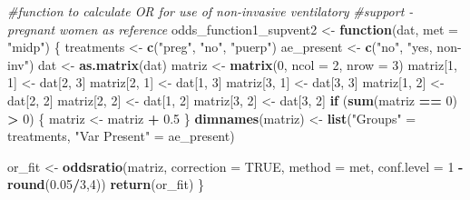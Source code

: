 \documentclass[
]{article}
\newenvironment{Shaded}{\begin{snugshade}}{\end{snugshade}}
\newcommand{\CommentTok}[1]{\textcolor[rgb]{0.56,0.35,0.01}{\textit{#1}}}
\newcommand{\ControlFlowTok}[1]{\textcolor[rgb]{0.13,0.29,0.53}{\textbf{#1}}}
\newcommand{\DataTypeTok}[1]{\textcolor[rgb]{0.13,0.29,0.53}{#1}}
\newcommand{\DecValTok}[1]{\textcolor[rgb]{0.00,0.00,0.81}{#1}}
\newcommand{\FloatTok}[1]{\textcolor[rgb]{0.00,0.00,0.81}{#1}}
\newcommand{\KeywordTok}[1]{\textcolor[rgb]{0.13,0.29,0.53}{\textbf{#1}}}
\newcommand{\NormalTok}[1]{#1}
\newcommand{\OperatorTok}[1]{\textcolor[rgb]{0.81,0.36,0.00}{\textbf{#1}}}
\newcommand{\OtherTok}[1]{\textcolor[rgb]{0.56,0.35,0.01}{#1}}
\newcommand{\StringTok}[1]{\textcolor[rgb]{0.31,0.60,0.02}{#1}}
\begin{document}
\begin{Shaded}
\begin{Highlighting}[]
\CommentTok{#function to calculate OR for use of non-invasive ventilatory }
\CommentTok{#support - pregnant women as reference}
\NormalTok{odds_function1_supvent2 <-}\StringTok{ }\ControlFlowTok{function}\NormalTok{(dat, }\DataTypeTok{met =} \StringTok{"midp"}\NormalTok{) \{}
\NormalTok{  treatments <-}\StringTok{ }\KeywordTok{c}\NormalTok{(}\StringTok{"preg"}\NormalTok{, }\StringTok{"no"}\NormalTok{, }\StringTok{"puerp"}\NormalTok{)}
\NormalTok{  ae_present <-}\StringTok{ }\KeywordTok{c}\NormalTok{(}\StringTok{"no"}\NormalTok{, }\StringTok{"yes, non-inv"}\NormalTok{)}
\NormalTok{  dat <-}\StringTok{ }\KeywordTok{as.matrix}\NormalTok{(dat)}
\NormalTok{  matriz <-}\StringTok{ }\KeywordTok{matrix}\NormalTok{(}\DecValTok{0}\NormalTok{, }\DataTypeTok{ncol =} \DecValTok{2}\NormalTok{, }\DataTypeTok{nrow =} \DecValTok{3}\NormalTok{)}
\NormalTok{  matriz[}\DecValTok{1}\NormalTok{, }\DecValTok{1}\NormalTok{] <-}\StringTok{ }\NormalTok{dat[}\DecValTok{2}\NormalTok{, }\DecValTok{3}\NormalTok{]}
\NormalTok{  matriz[}\DecValTok{2}\NormalTok{, }\DecValTok{1}\NormalTok{] <-}\StringTok{ }\NormalTok{dat[}\DecValTok{1}\NormalTok{, }\DecValTok{3}\NormalTok{]}
\NormalTok{  matriz[}\DecValTok{3}\NormalTok{, }\DecValTok{1}\NormalTok{] <-}\StringTok{ }\NormalTok{dat[}\DecValTok{3}\NormalTok{, }\DecValTok{3}\NormalTok{]}
\NormalTok{  matriz[}\DecValTok{1}\NormalTok{, }\DecValTok{2}\NormalTok{] <-}\StringTok{ }\NormalTok{dat[}\DecValTok{2}\NormalTok{, }\DecValTok{2}\NormalTok{]}
\NormalTok{  matriz[}\DecValTok{2}\NormalTok{, }\DecValTok{2}\NormalTok{] <-}\StringTok{ }\NormalTok{dat[}\DecValTok{1}\NormalTok{, }\DecValTok{2}\NormalTok{]}
\NormalTok{  matriz[}\DecValTok{3}\NormalTok{, }\DecValTok{2}\NormalTok{] <-}\StringTok{ }\NormalTok{dat[}\DecValTok{3}\NormalTok{, }\DecValTok{2}\NormalTok{]}
  \ControlFlowTok{if}\NormalTok{ (}\KeywordTok{sum}\NormalTok{(matriz }\OperatorTok{==}\StringTok{ }\DecValTok{0}\NormalTok{) }\OperatorTok{>}\StringTok{ }\DecValTok{0}\NormalTok{) \{}
\NormalTok{    matriz <-}\StringTok{ }\NormalTok{matriz }\OperatorTok{+}\StringTok{ }\FloatTok{0.5}
\NormalTok{  \}}
  \KeywordTok{dimnames}\NormalTok{(matriz) <-}\StringTok{ }\KeywordTok{list}\NormalTok{(}\StringTok{"Groups"}\NormalTok{ =}\StringTok{ }\NormalTok{treatments,}
                           \StringTok{"Var Present"}\NormalTok{ =}\StringTok{ }\NormalTok{ae_present)}
  
\NormalTok{  or_fit <-}\StringTok{ }\KeywordTok{oddsratio}\NormalTok{(matriz, }\DataTypeTok{correction =} \OtherTok{TRUE}\NormalTok{, }\DataTypeTok{method =}\NormalTok{ met, }\DataTypeTok{conf.level =} \DecValTok{1} \OperatorTok{-}\StringTok{ }\KeywordTok{round}\NormalTok{(}\FloatTok{0.05}\OperatorTok{/}\DecValTok{3}\NormalTok{,}\DecValTok{4}\NormalTok{))}
  \KeywordTok{return}\NormalTok{(or_fit)}
\NormalTok{\}}
\end{Highlighting}
\end{Shaded}
\end{document}
